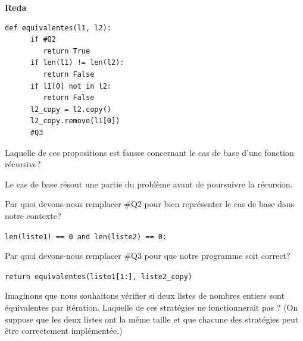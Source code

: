 \begin{Exercice}[5 minutes]\textbf{Reda}

\begin{lstlisting}[style=pythonstyle]
def equivalentes(l1, l2):
      if #Q2
         return True
      if len(l1) != len(l2):
         return False
      if l1[0] not in l2:
         return False
      l2_copy = l2.copy()
      l2_copy.remove(l1[0])
      #Q3
\end{lstlisting}

Laquelle de ces propositions est fausse concernant le cas de base d’une fonction récursive?

\begin{solution}
Le cas de base résout une partie du problème avant de poursuivre la récursion.
\end{solution}

Par quoi devons-nous remplacer \#Q2 pour bien représenter le cas de base dans notre contexte?

\begin{solution}
    \texttt{len(liste1) == 0 and len(liste2) == 0:}
\end{solution}

Par quoi devons-nous remplacer \#Q3 pour que notre programme soit correct?
\begin{solution}
    \texttt{return equivalentes(liste1[1:], liste2\_copy)}
\end{solution}

Imaginons que nous souhaitons vérifier si deux listes de nombres entiers sont équivalentes par itération. Laquelle de ces stratégies ne fonctionnerait pas ?
(On suppose que les deux listes ont la même taille et que chacune des stratégies peut être correctement implémentée.)


\end{Exercice}
